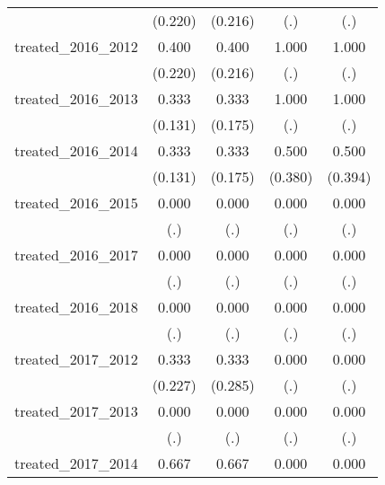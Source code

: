{\begin{tabular}{l*{4}{c}}
            &     (0.220)         &     (0.216)         &         (.)         &         (.)         \\
[1em]
treated\_2016\_2012&       0.400         &       0.400         &       1.000         &       1.000         \\
            &     (0.220)         &     (0.216)         &         (.)         &         (.)         \\
[1em]
treated\_2016\_2013&       0.333\sym{*}  &       0.333         &       1.000         &       1.000         \\
            &     (0.131)         &     (0.175)         &         (.)         &         (.)         \\
[1em]
treated\_2016\_2014&       0.333\sym{*}  &       0.333         &       0.500         &       0.500         \\
            &     (0.131)         &     (0.175)         &     (0.380)         &     (0.394)         \\
[1em]
treated\_2016\_2015&       0.000         &       0.000         &       0.000         &       0.000         \\
            &         (.)         &         (.)         &         (.)         &         (.)         \\
[1em]
treated\_2016\_2017&       0.000         &       0.000         &       0.000         &       0.000         \\
            &         (.)         &         (.)         &         (.)         &         (.)         \\
[1em]
treated\_2016\_2018&       0.000         &       0.000         &       0.000         &       0.000         \\
            &         (.)         &         (.)         &         (.)         &         (.)         \\
[1em]
treated\_2017\_2012&       0.333         &       0.333         &       0.000         &       0.000         \\
            &     (0.227)         &     (0.285)         &         (.)         &         (.)         \\
[1em]
treated\_2017\_2013&       0.000         &       0.000         &       0.000         &       0.000         \\
            &         (.)         &         (.)         &         (.)         &         (.)         \\
[1em]
treated\_2017\_2014&       0.667\sym{**} &       0.667\sym{*}  &       0.000         &       0.000         \\

\end{tabular}}
